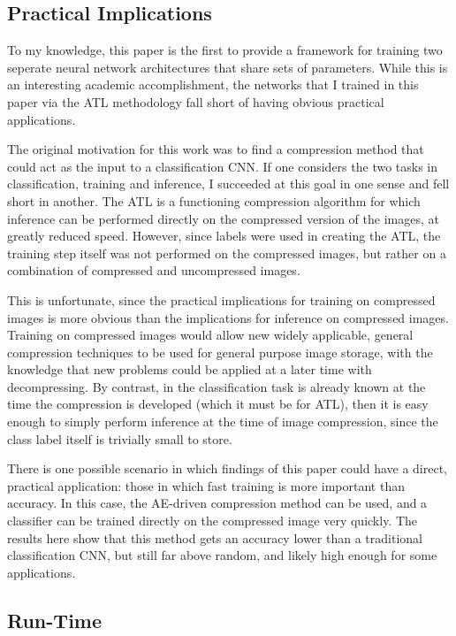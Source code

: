 \documentclass[twoside,11pt]{article}
\begin{document}
\subsection{Practical Implications}

To my knowledge, this paper is the first to provide a framework for training two 
seperate neural network architectures that share sets of parameters. 
While this is an interesting academic accomplishment, the networks that I trained 
in this paper via the ATL methodology fall short of having obvious practical applications.

The original motivation for this work was to find a compression method that could act as
the input to a classification CNN. If one considers the two tasks in classification,
training and inference, I succeeded at this goal in one sense and fell short in another. 
The ATL is a functioning compression algorithm for which inference can be performed directly
on the compressed version of the images, at greatly reduced speed. However, since labels
were used in creating the ATL, the training step itself was not performed on the compressed 
images, but rather on a combination of compressed and uncompressed images. 

This is unfortunate, since the practical implications for training on compressed images 
is more obvious than the implications for inference on compressed images. Training on 
compressed images would allow new widely applicable, general compression techniques to 
be used for general purpose image storage, with the knowledge that new problems could be
applied at a later time with decompressing. By contrast, in the classification task is
already known at the time the compression is developed (which it must be for ATL), 
then it is easy enough to simply perform inference at the time of
image compression, since the class label itself is trivially small to store. 

There is one possible scenario in which findings of this paper could have a direct, practical
application: those in which
fast training is more important than accuracy. In this case, the AE-driven compression
method can be used, and a classifier can be trained directly on the compressed image very quickly.
The results here show that this method gets an accuracy lower than a traditional 
classification CNN, but still far above random, and likely high enough for some applications.

\subsection{Run-Time}
\end{document}
